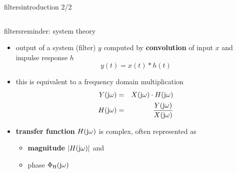 \begin{frame}{filters}{introduction 2/2}
\begin{columns}
                \vspace{70mm}
        \end{columns}
	\end{frame}
 
    \begin{frame}{filters}{reminder: system theory}
        \begin{itemize}
            \item output of a system (filter) $y$ computed by \textbf{convolution} of input $x$ and impulse response $h$
                \begin{equation*}
                    y(t) = x(t) \ast h(t)   
                \end{equation*}
            \bigskip
            \item<2-> this is equivalent to a frequency domain multiplication 
                \begin{eqnarray*}
                    Y(\mathrm{j}\omega) &=& X(\mathrm{j}\omega) \cdot H(\mathrm{j}\omega)\\
                    H(\mathrm{j}\omega) &=& \frac{Y(\mathrm{j}\omega)}{X(\mathrm{j}\omega)}
                \end{eqnarray*}
            \bigskip
            \item<3-> \textbf{transfer function} $H(\mathrm{j}\omega)$ is complex, often represented as 
                \begin{itemize}
                    \item \textbf{magnitude} $|H(\mathrm{j}\omega)|$ and 
                    \item phase $\Phi_\mathrm{H}(\mathrm{j}\omega)$
                \end{itemize}
        \end{itemize}
    \end{frame}
   
